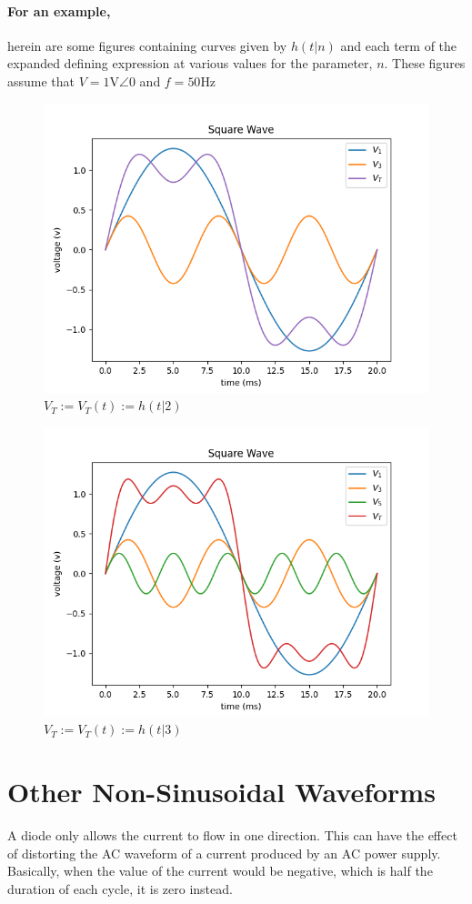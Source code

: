 \documentclass{article}
\begin{document}
	\paragraph[Examples]{For an example, }herein are some figures containing 
	curves given by $h(t \vert n)$ and each term of the expanded defining 
	expression at various values for the parameter, $n$.  These figures assume 
	that $V=1\text{V}\angle0$ and $f=50\text{Hz}$
	\begin{figure}[h]\label{fig:sqr-wave_3}
		\centering
		\includegraphics[width=0.784\linewidth,height=0.588\linewidth]{square-wave-3}
		\caption{$V_T:=V_T(t):=h(t \vert 2)$}
	\end{figure}
	\begin{figure}[h]\label{fig:square-wave_5}
		\centering
		\includegraphics[width=0.784\linewidth,height=0.588\linewidth]{square-wave-5}
		\caption{$V_T:=V_T(t):=h(t \vert 3)$}
	\end{figure}
	\section[Other]{Other Non-Sinusoidal Waveforms}
	A diode only allows the current to flow in one direction.  This can have 
	the effect of distorting the AC waveform of a current produced by an AC 
	power supply.  Basically, when the value of the current would be negative, 
	which is half the duration of each cycle, it is zero instead.
\end{document}
